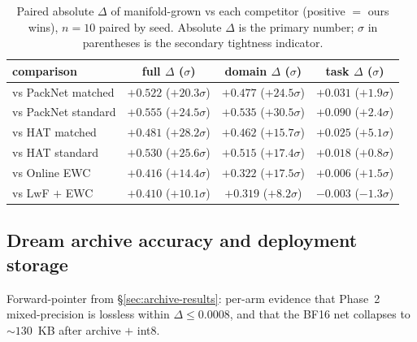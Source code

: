 \documentclass[11pt]{article}
\begin{document}
\begin{table}[h]
  \centering
  \caption{Paired absolute $\Delta$ of manifold-grown vs each
           competitor (positive $=$ ours wins), $n = 10$ paired by
           seed. Absolute $\Delta$ is the primary number; $\sigma$ in
           parentheses is the secondary tightness indicator.}
  \label{tab:supp-paired-sigma}
  \begin{tabular}{lccc}
    \toprule
    comparison              & full $\Delta$ ($\sigma$) & domain $\Delta$ ($\sigma$) & task $\Delta$ ($\sigma$) \\
    \midrule
    vs PackNet matched      & $+0.522$ ($+20.3\sigma$) & $+0.477$ ($+24.5\sigma$)   & $+0.031$ ($+1.9\sigma$)  \\
    vs PackNet standard     & $+0.555$ ($+24.5\sigma$) & $+0.535$ ($+30.5\sigma$)   & $+0.090$ ($+2.4\sigma$)  \\
    vs HAT matched          & $+0.481$ ($+28.2\sigma$) & $+0.462$ ($+15.7\sigma$)   & $+0.025$ ($+5.1\sigma$)  \\
    vs HAT standard         & $+0.530$ ($+25.6\sigma$) & $+0.515$ ($+17.4\sigma$)   & $+0.018$ ($+0.8\sigma$)  \\
    vs Online EWC           & $+0.416$ ($+14.4\sigma$) & $+0.322$ ($+17.5\sigma$)   & $+0.006$ ($+1.5\sigma$)  \\
    vs LwF $+$ EWC          & $+0.410$ ($+10.1\sigma$) & $+0.319$ ($+8.2\sigma$)    & $-0.003$ ($-1.3\sigma$)  \\
    \bottomrule
  \end{tabular}
\end{table}

\subsection{Dream archive accuracy and deployment storage}
\label{app:supp-archive}

Forward-pointer from \S\ref{sec:archive-results}: per-arm evidence
that Phase~2 mixed-precision is lossless within
$\Delta \leq 0.0008$, and that the BF16 net collapses to
$\sim\!130$~KB after archive $+$ int8.
\end{document}
